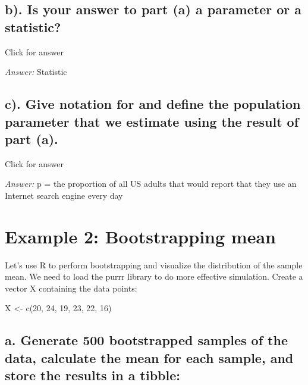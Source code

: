 \documentclass[
]{book}
\newenvironment{Shaded}{\begin{snugshade}}{\end{snugshade}}
\newcommand{\DecValTok}[1]{\textcolor[rgb]{0.00,0.00,0.81}{#1}}
\newcommand{\FunctionTok}[1]{\textcolor[rgb]{0.00,0.00,0.00}{#1}}
\newcommand{\NormalTok}[1]{#1}
\newcommand{\OtherTok}[1]{\textcolor[rgb]{0.56,0.35,0.01}{#1}}
\begin{document}
\hypertarget{b.-is-your-answer-to-part-a-a-parameter-or-a-statistic}{%
\subsection{b). Is your answer to part (a) a parameter or a statistic?}\label{b.-is-your-answer-to-part-a-a-parameter-or-a-statistic}}

Click for answer

\emph{Answer:} Statistic

\hypertarget{c.-give-notation-for-and-define-the-population-parameter-that-we-estimate-using-the-result-of-part-a.}{%
\subsection{c). Give notation for and define the population parameter that we estimate using the result of part (a).}\label{c.-give-notation-for-and-define-the-population-parameter-that-we-estimate-using-the-result-of-part-a.}}

Click for answer

\emph{Answer:} p = the proportion of all US adults that would report that they use an Internet search engine every day

\hypertarget{example-2-bootstrapping-mean}{%
\section{Example 2: Bootstrapping mean}\label{example-2-bootstrapping-mean}}

Let's use R to perform bootstrapping and visualize the distribution of the sample mean. We need to load the purrr library to do more effective simulation. Create a vector X containing the data points:

\begin{Shaded}
\begin{Highlighting}[]
\NormalTok{X }\OtherTok{\textless{}{-}} \FunctionTok{c}\NormalTok{(}\DecValTok{20}\NormalTok{, }\DecValTok{24}\NormalTok{, }\DecValTok{19}\NormalTok{, }\DecValTok{23}\NormalTok{, }\DecValTok{22}\NormalTok{, }\DecValTok{16}\NormalTok{)}
\end{Highlighting}
\end{Shaded}

\hypertarget{a.-generate-500-bootstrapped-samples-of-the-data-calculate-the-mean-for-each-sample-and-store-the-results-in-a-tibble}{%
\subsection{a. Generate 500 bootstrapped samples of the data, calculate the mean for each sample, and store the results in a tibble:}\label{a.-generate-500-bootstrapped-samples-of-the-data-calculate-the-mean-for-each-sample-and-store-the-results-in-a-tibble}}
\end{document}
